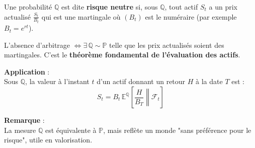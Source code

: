 \begin{f}
	
	Une probabilité \(\mathbb{Q}\) est dite \textbf{risque neutre} si, sous \(\mathbb{Q}\), 
	tout actif  \(S_t\) a un prix actualisé \( \frac{S_t}{B_t}\) qui est une martingale
	où \((B_t)\) est le numéraire (par exemple \(B_t = e^{rt}\)).
	
	L'absence d'arbitrage \(\iff \exists\, \mathbb{Q} \sim \mathbb{P}\) telle que les prix actualisés soient des martingales.
	C’est le \textbf{théorème fondamental de l’évaluation des actifs}.
	
	\textbf{Application} :\\
	Sous \(\mathbb{Q}\), la valeur à l’instant \(t\) d’un actif donnant un retour \(H\) à la date \(T\) est :
	\[
	S_t = B_t\, \mathbb{E}^\mathbb{Q} \left[ \left. \frac{H}{B_T} \right\|  \mathcal{F}_t \right]
	\]
	
	\textbf{Remarque} :\\
	La mesure \(\mathbb{Q}\) est équivalente à \(\mathbb{P}\), mais reflète un monde "sans préférence pour le risque", utile en valorisation.
	
\end{f}
\newcolumn

